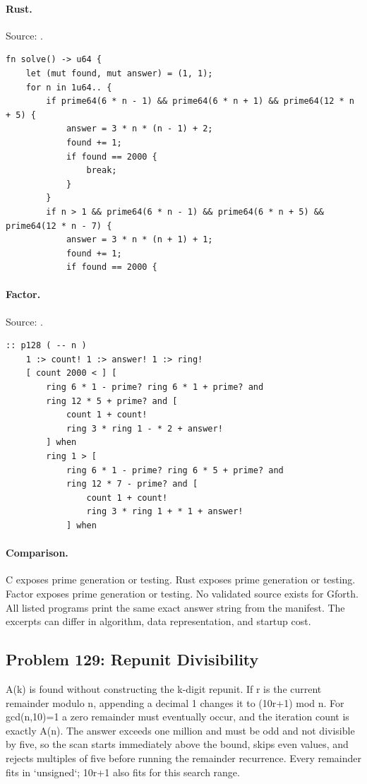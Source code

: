 \paragraph{Rust.} Source: .
\begin{lstlisting}
fn solve() -> u64 {
    let (mut found, mut answer) = (1, 1);
    for n in 1u64.. {
        if prime64(6 * n - 1) && prime64(6 * n + 1) && prime64(12 * n + 5) {
            answer = 3 * n * (n - 1) + 2;
            found += 1;
            if found == 2000 {
                break;
            }
        }
        if n > 1 && prime64(6 * n - 1) && prime64(6 * n + 5) && prime64(12 * n - 7) {
            answer = 3 * n * (n + 1) + 1;
            found += 1;
            if found == 2000 {
\end{lstlisting}

\paragraph{Factor.} Source: .
\begin{lstlisting}
:: p128 ( -- n )
    1 :> count! 1 :> answer! 1 :> ring!
    [ count 2000 < ] [
        ring 6 * 1 - prime? ring 6 * 1 + prime? and
        ring 12 * 5 + prime? and [
            count 1 + count!
            ring 3 * ring 1 - * 2 + answer!
        ] when
        ring 1 > [
            ring 6 * 1 - prime? ring 6 * 5 + prime? and
            ring 12 * 7 - prime? and [
                count 1 + count!
                ring 3 * ring 1 + * 1 + answer!
            ] when
\end{lstlisting}

\paragraph{Comparison.}
C exposes prime generation or testing. Rust exposes prime generation or testing. Factor exposes prime generation or testing.
No validated source exists for Gforth.
All listed programs print the same exact answer string from the manifest. The excerpts can differ in algorithm, data representation, and startup cost.

\subsection{Problem 129: Repunit Divisibility}
\label{walkthrough:p129}
A(k) is found without constructing the k-digit repunit. If r is the current remainder modulo n, appending a decimal 1 changes it to (10r+1) mod n. For gcd(n,10)=1 a zero remainder must eventually occur, and the iteration count is exactly A(n). The answer exceeds one million and must be odd and not divisible by five, so the scan starts immediately above the bound, skips even values, and rejects multiples of five before running the remainder recurrence. Every remainder fits in `unsigned`; 10r+1 also fits for this search range.

